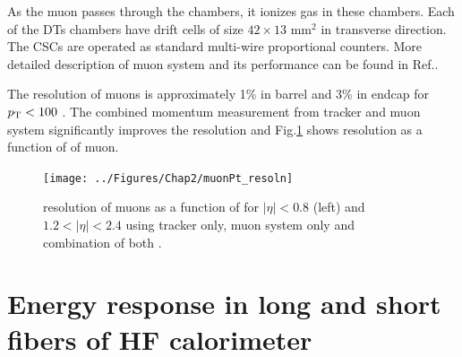 As the muon passes through the chambers, it ionizes gas in these chambers. Each of the DTs chambers have drift cells of size $42\times 13$ mm$^2$ in transverse direction. The CSCs are operated as standard multi-wire proportional counters. More detailed description of muon system and its performance can be found in Ref.\cite{Sirunyan:2018fpa,Chatrchyan:2008aa,Chatrchyan:2013sba}.

The \pt resolution of muons is approximately 1\% in barrel and 3\% in endcap for $p_{\mathrm{T}} < 100$ \gev \cite{Sirunyan:2018fpa}. The combined momentum measurement from tracker and muon system significantly improves the resolution and Fig.\ref{fig:muonPt_resoln} shows \pt resolution as a function of \pt of muon.

\begin{figure}[h!]
\centering
\texttt{[image: ../Figures/Chap2/muonPt\_resoln]}
\captionsetup{width=.95\linewidth}
\caption[Muon \pt resolution]{\pt resolution of muons as a function of \pt for $|\eta| < 0.8$ (left) and $1.2 < |\eta| < 2.4$ using tracker only, muon system only and combination of both \cite{Chatrchyan:2008aa}.}
\label{fig:muonPt_resoln}
\end{figure}


\section{Energy response in long and short fibers of HF calorimeter}
\label{chap2HFsec}

